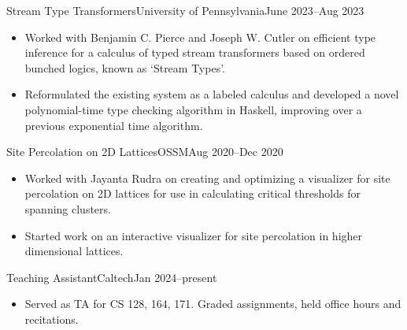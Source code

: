 \documentclass[a4paper,10pt]{article}
\begin{document}
    \begin{activity*}{Stream Type Transformers}{University of Pennsylvania}{June 2023--Aug 2023}
      \begin{itemize}[topsep=4pt, partopsep=0pt, itemsep=-2pt]
        \item Worked with Benjamin C. Pierce and Joseph W. Cutler on efficient type inference for a calculus of typed stream transformers based on ordered bunched logics, known as `Stream Types'.
        \item Reformulated the existing system as a labeled calculus and developed a novel polynomial-time type checking algorithm in Haskell, improving over a previous exponential time algorithm.
      \end{itemize}
    \end{activity*}

    \begin{activity*}{Site Percolation on 2D Lattices}{OSSM}{Aug 2020--Dec 2020}
      \begin{itemize}[topsep=4pt, partopsep=0pt, itemsep=-2pt]
        \item Worked with Jayanta Rudra on creating and optimizing a visualizer for site percolation on 2D lattices for use in calculating critical thresholds for spanning clusters.
        \item Started work on an interactive visualizer for site percolation in higher dimensional lattices.
      \end{itemize}
    \end{activity*}

    \begin{description}[topsep=4pt, partopsep=0pt, itemsep=-2pt]
    \end{description}

    \begin{activity*}{Teaching Assistant}{Caltech}{Jan 2024--present}
      \begin{itemize}[label={}, nosep]
        \item Served as TA for CS 128, 164, 171. Graded assignments, held office hours and recitations.
      \end{itemize}
    \end{activity*}
\end{document}
